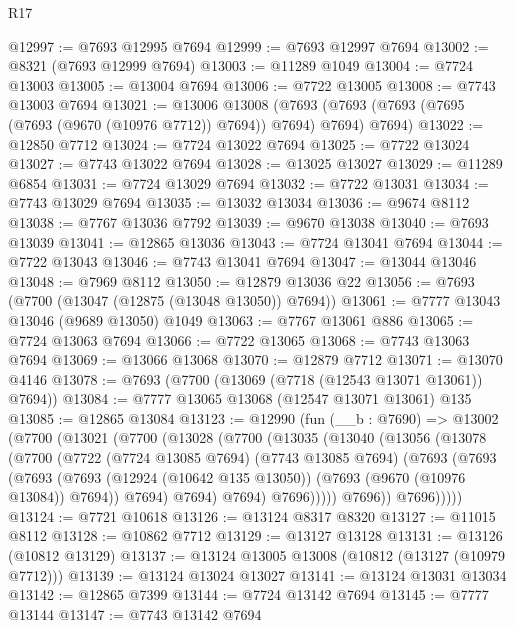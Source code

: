 \begin{lexlean}{R17}
\begin{coremodule}
@12997 := @7693 @12995 @7694
@12999 := @7693 @12997 @7694
@13002 := @8321 (@7693 @12999 @7694)
@13003 := @11289 @1049
@13004 := @7724 @13003
@13005 := @13004 @7694
@13006 := @7722 @13005
@13008 := @7743 @13003 @7694
@13021 := @13006
    @13008
    (@7693 (@7693 (@7693 (@7695 (@7693 (@9670 (@10976 @7712)) @7694)) @7694) @7694) @7694)
@13022 := @12850 @7712
@13024 := @7724 @13022 @7694
@13025 := @7722 @13024
@13027 := @7743 @13022 @7694
@13028 := @13025 @13027
@13029 := @11289 @6854
@13031 := @7724 @13029 @7694
@13032 := @7722 @13031
@13034 := @7743 @13029 @7694
@13035 := @13032 @13034
@13036 := @9674 @8112
@13038 := @7767 @13036 @7792
@13039 := @9670 @13038
@13040 := @7693 @13039
@13041 := @12865 @13036
@13043 := @7724 @13041 @7694
@13044 := @7722 @13043
@13046 := @7743 @13041 @7694
@13047 := @13044 @13046
@13048 := @7969 @8112
@13050 := @12879 @13036 @22
@13056 := @7693 (@7700 (@13047 (@12875 (@13048 @13050)) @7694))
@13061 := @7777 @13043 @13046 (@9689 @13050) @1049
@13063 := @7767 @13061 @886
@13065 := @7724 @13063 @7694
@13066 := @7722 @13065
@13068 := @7743 @13063 @7694
@13069 := @13066 @13068
@13070 := @12879 @7712
@13071 := @13070 @4146
@13078 := @7693 (@7700 (@13069 (@7718 (@12543 @13071 @13061)) @7694))
@13084 := @7777 @13065 @13068 (@12547 @13071 @13061) @135
@13085 := @12865 @13084
@13123 := @12990
    (fun (__b : @7690) =>
    @13002
      (@7700
        (@13021
          (@7700
            (@13028
              (@7700
                (@13035
                  (@13040
                    (@13056
                      (@13078
                        (@7700
                          (@7722
                            (@7724 @13085 @7694)
                            (@7743 @13085 @7694)
                            (@7693
                              (@7693
                                (@7693
                                  (@7693
                                    (@12924 (@10642 @135 @13050))
                                    (@7693 (@9670 (@10976 @13084)) @7694))
                                  @7694)
                                @7694)
                              @7694)
                            @7696)))))
                  @7696))
              @7696)))))
@13124 := @7721 @10618
@13126 := @13124 @8317 @8320
@13127 := @11015 @8112
@13128 := @10862 @7712
@13129 := @13127 @13128
@13131 := @13126 (@10812 @13129)
@13137 := @13124 @13005 @13008 (@10812 (@13127 (@10979 @7712)))
@13139 := @13124 @13024 @13027
@13141 := @13124 @13031 @13034
@13142 := @12865 @7399
@13144 := @7724 @13142 @7694
@13145 := @7777 @13144
@13147 := @7743 @13142 @7694

\end{coremodule}
\end{lexlean}

